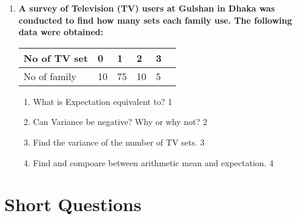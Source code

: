 \documentclass[a4paper,oneside, margin=1.4in]{book}
\begin{document}
\begin{enumerate}
     \item
	  \textbf{A survey of Television (TV) users at Gulshan in Dhaka was conducted to find how many sets each family use. The following data were obtained:} 
	  
	  	  \begin{table}[h]
	  \begin{center}
\begin{tabular}{llllll}
No of TV set    & 0 & 1  & 2 & 3    \\ \hline
No of family & 10 & 75 & 10 & 5
\end{tabular}
\end{center}	
\end{table}
  
  \begin{enumerate}
    \item
	What is Expectation equivalent to? \hfill 1
    \item
	Can Variance be negative? Why or why not? \hfill 2
    \item  
	Find the variance of the number of TV sets. \hfill 3
    \item
	Find and compoare between arithmetic mean and expectation. \hfill 4
  \end{enumerate}
  \end{enumerate}
  
\section{Short Questions}
\end{document}
